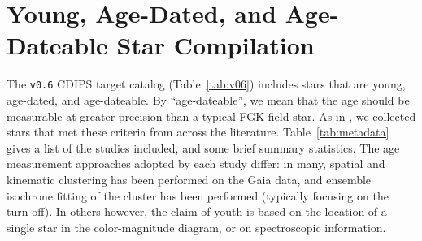\documentclass[12pt,modern,twocolumn,tighten]{aastex63}
\begin{document}







\clearpage
                            
 

\appendix
\section{Young, Age-Dated, and Age-Dateable Star Compilation}
\label{app:targetlist}


The \texttt{v0.6} CDIPS target catalog (Table~\ref{tab:v06}) includes
stars that are young, age-dated, and age-dateable.  By ``age-dateable'',
we mean that the age should be measurable at greater
precision than a typical FGK field star.
As in
\citet{bouma_cdipsI_2019}, we collected stars that met these criteria
from across the literature.  Table~\ref{tab:metadata} gives a list of
the studies included, and some brief summary statistics.
The age measurement approaches adopted by each study differ: in many,
spatial and kinematic clustering has been performed on the Gaia data,
and ensemble isochrone fitting of the cluster has been performed
(typically focusing on the turn-off).
In others however, the claim of youth is based on the location of a
single star in the color-magnitude diagram, or on spectroscopic
information.
\end{document}
